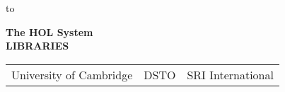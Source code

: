 

\begin{titlepage}
\null\vskip-47pt
\hbox to 

\setcounter{page}{1}		          %

\vspace*{60mm}


\begin{center}
 {\Huge\bf The HOL System}\\[0.4cm]
{\LARGE\bf LIBRARIES}\\[2.5cm]
\end{center}

\vspace*{100mm}
\begin{center}
\begin{tabular}{ccc}
University of Cambridge & \hspace*{10ex}DSTO\hspace*{10ex} & SRI International
\end{tabular}
\end{center}

\vfill
\end{titlepage}

\thispagestyle{empty}
\mbox{}
\newpage
